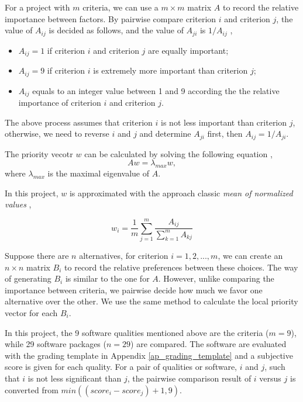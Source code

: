 For a project with $ m $ criteria, we can use a  $m\times m$ matrix $A$ to record the relative importance between factors. By pairwise compare criterion $i$ and criterion $j$, the value of $A_{ij}$ is decided as follows, and the value of $A_{ji}$ is $1/A_{ij}$ \cite{Saaty1990},
\begin{itemize}
	\item $A_{ij} = 1$ if criterion $i$ and criterion $j$ are equally important;
	\item $A_{ij} = 9$ if criterion $i$ is extremely more important than criterion $j$;
	\item $A_{ij}$ equals to an integer value between 1 and 9 according the the relative importance of criterion $i$ and criterion $j$.
\end{itemize}

The above process assumes that criterion $i$ is not less important than criterion $j$, otherwise, we need to reverse $i$ and $j$ and determine $A_{ji}$ first, then $A_{ij} = 1/A_{ji}$.

The priority vecotr $w$ can be calculated by solving the following equation \cite{Saaty1990}, \begin{equation}
Aw = \lambda_{max}w,
\end{equation}
where $\lambda_{max}$ is the maximal eigenvalue of $A$.

In this project, $w$ is approximated with the approach classic \textit{mean of normalized values}  \cite{AlessioEtAl2006},

\begin{equation}
w_i = \frac{1}{m}\sum_{j=1}^{m}\frac{A_{ij}}{\sum_{k=1}^{m}A_{kj}}
\end{equation}

Suppose there are $n$ alternatives, for criterion $i = 1, 2, ... , m$, we can create an $n\times n$ matrix $B_i$ to record the relative preferences between these choices. The way of generating $B_i$ is similar to the one for $A$. However, unlike comparing the importance between criteria, we pairwise decide how much we favor one alternative over the other. We use the same method to calculate the local priority vector for each $B_i$.

In this project, the 9 software qualities mentioned above are the criteria ($m = 9$), while 29 software packages ($n = 29$) are compared. The software are evaluated with the grading template in Appendix \ref{ap_grading_template} and a subjective score is given for each quality. For a pair of qualities or software, $i$ and $j$, such that $i$ is not less significant than $j$, the pairwise comparison result of $i$ versus $j$ is converted from $min((score_i - score_j) + 1, 9)$.
